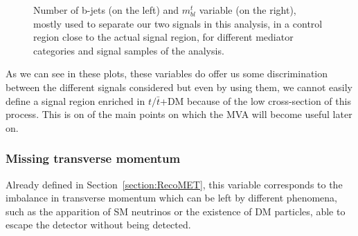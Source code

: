 \documentclass[a4paper, 10pt, openright]{report}
\begin{document}
\begin{figure}[htbp]
\caption{Number of b-jets (on the left) and $m_{bl}^t$ variable (on the right), mostly used to separate our two signals in this analysis, in a control region close to the actual signal region, for different mediator categories and signal samples of the analysis.}
\label{fig:signalsDiscrimination}
\end{figure}

As we can see in these plots, these variables do offer us some discrimination between the different signals considered but even by using them, we cannot easily define a signal region enriched in $t/ \bar t$+DM because of the low cross-section of this process. This is on of the main points on which the \ac{MVA} will become useful later on.

\subsubsection*{Missing transverse momentum}

Already defined in Section~\ref{section:RecoMET}, this variable corresponds to the imbalance in transverse momentum which can be left by different phenomena, such as the apparition of \ac{SM} neutrinos or the existence of \ac{DM} particles, able to escape the detector without being detected.
\end{document}
